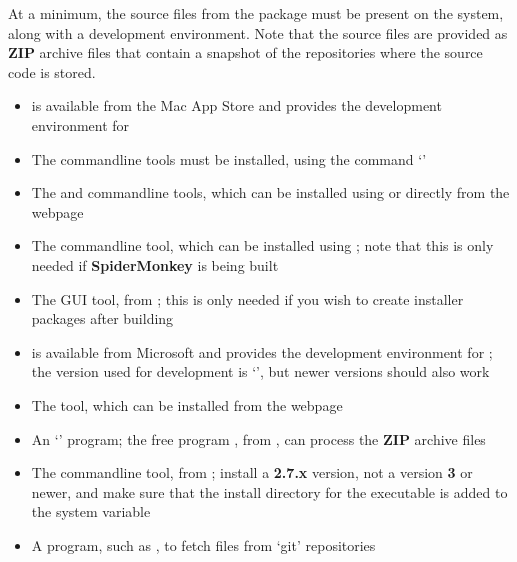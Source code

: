 At a minimum, the source files from the  package must be present on the
system, along with a  development environment.
Note that the source files are provided as \textbf{ZIP} archive files that contain a
snapshot of the  repositories where the source code is stored.
\tertiaryEnd
{}
\begin{itemize}
\item{} is available from the Mac App Store and provides the
 development environment for \osx{}
\item\exSp{}The  command\longDash{}line tools must be installed, using the
command `'
\item\exSp{}The  and  command\longDash{}line tools, which
can be installed using  or directly from the web\longDash{}page
\item\exSp{}The  command\longDash{}line tool, which can be installed
using ; note that this is only needed if \textbf{SpiderMonkey} is being
built
\item\exSp{}The  GUI tool, from
;
this is only needed if you wish to create installer packages after building \mplusm
\end{itemize}
\tertiaryEnd
{}
\begin{itemize}
\item{} is available from Microsoft and provides the 
development environment for \win; the version used for development is
`', but newer versions should also work
\item\exSp{}The  tool, which can be installed from the web\longDash{}page
\item\exSp{}An `' program; the free program , from
, can process the \textbf{ZIP} archive files
\item\exSp{}The  command\longDash{}line tool, from
; install a \textbf{2.7.x}
version, not a version \textbf{3} or newer, and make sure that the install directory for
the executable is added to the system  variable
\item\exSp{}A program, such as , to fetch files from `git' repositories
\end{itemize}
